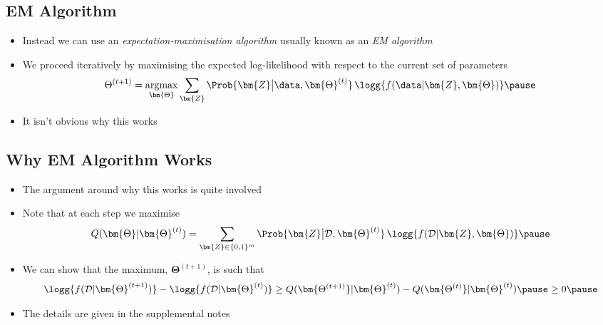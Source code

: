 
\begin{slide}
\section[-1]{EM Algorithm}

\begin{PauseHighLight}
  \begin{itemize}
  \item Instead we can use an \emph{expectation-maximisation
      algorithm} usually known as an \emph{EM algorithm}\pause
  \item We proceed iteratively by maximising the expected
    log-likelihood with respect to the current set of parameters
    \begin{align*}
      \Theta^{(t+1)} = \mathop{\mathrm{argmax}}_{\bm{\Theta}}
      \sum_{\bm{Z}} \Prob{\bm{Z}\big|\data,\bm{\Theta}^{(t)}}\,
      \logg{f(\data|\bm{Z}, \bm{\Theta})}\pause
    \end{align*}
  \item It isn't obvious why this works\pause
  \end{itemize}
\end{PauseHighLight}

\end{slide}


\begin{slide}
\section{Why EM Algorithm Works}
\begin{PauseHighLight}
  \begin{itemize}
  \item The argument around why this works is quite involved\pause
  \item Note that at each step we maximise
    \begin{align*}
      Q(\bm{\Theta}|\bm{\Theta}^{(t)})
      =  \sum_{\bm{Z}\in\{0,1\}^m}
      \Prob{\bm{Z}\big|\mathcal{D},\bm{\Theta}^{(t)}}\,
        \logg{f(\mathcal{D}|\bm{Z}, \bm{\Theta})}\pause
    \end{align*}
  \item We can show that the maximum, $\bm{\Theta}^{(t+1)}$, is such
    that{\small
    \begin{align*}
      \logg{f(\mathcal{D}|\bm{\Theta}^{(t+1)})} -
      \logg{f(\mathcal{D}|\bm{\Theta}^{(t)})} \geq
      Q(\bm{\Theta^{(t+1)}}|\bm{\Theta}^{(t)}) -
      Q(\bm{\Theta^{(t)}}|\bm{\Theta}^{(t)})\pause \geq 0\pause
    \end{align*}}
  \item The details are given in the supplemental notes\pause
  \end{itemize}
\end{PauseHighLight}
  

\end{slide}

